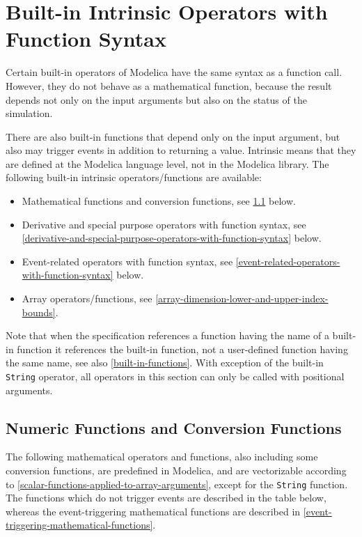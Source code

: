\section{Built-in Intrinsic Operators with Function Syntax}\label{built-in-intrinsic-operators-with-function-syntax}

Certain built-in operators of Modelica have the same syntax as a
function call. However, they do not behave as a mathematical function,
because the result depends not only on the input arguments but also on
the status of the simulation.

There are also built-in functions that depend only on the input
argument, but also may trigger events in addition to returning a value.
Intrinsic means that they are defined at the Modelica language level,
not in the Modelica library. The following built-in intrinsic
operators/functions are available:
\begin{itemize}
\item
  Mathematical functions and conversion functions, see \cref{numeric-functions-and-conversion-functions}
  below.
\item
  Derivative and special purpose operators with function syntax, see
  \cref{derivative-and-special-purpose-operators-with-function-syntax} below.
\item
  Event-related operators with function syntax, see \cref{event-related-operators-with-function-syntax} below.
\item
  Array operators/functions, see \cref{array-dimension-lower-and-upper-index-bounds}.
\end{itemize}

Note that when the specification references a function having the name
of a built-in function it references the built-in function, not a
user-defined function having the same name, see also \cref{built-in-functions}. With
exception of the built-in \lstinline!String! operator, all operators in this section
can only be called with positional arguments.

\subsection{Numeric Functions and Conversion Functions}\label{numeric-functions-and-conversion-functions}

The following mathematical operators and functions, also including some
conversion functions, are predefined in Modelica, and are vectorizable
according to \cref{scalar-functions-applied-to-array-arguments}, except for the \lstinline!String! function. The
functions which do not trigger events are described in the table below,
whereas the event-triggering mathematical functions are described in
\cref{event-triggering-mathematical-functions}.

